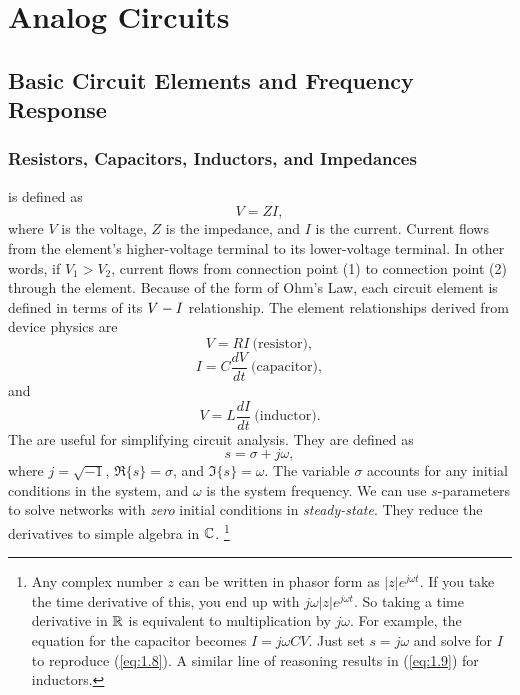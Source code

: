 \chapter{Analog Circuits} \hr
\section{Basic Circuit Elements and Frequency Response}
\subsection{Resistors, Capacitors, Inductors, and Impedances}
 is defined as
\begin{equation}
\label{eq:1.1}
V = Z I,
\end{equation}
where $V$ is the voltage, $Z$ is the impedance, and $I$ is the current. Current flows from the element's higher-voltage terminal to its lower-voltage terminal. In other words, if $V_{1} > V_{2}$, current flows from connection point (1) to connection point (2) through the element.
Because of the form of Ohm's Law, each circuit element is defined in terms of its $V \-- I$ relationship. The element relationships derived from device physics are
\begin{equation}
\label{eq:1.2}
V = R I ~\text{(resistor)},
\end{equation}
\begin{equation}
\label{eq:1.3}
I = C \frac{dV}{dt} ~\text{(capacitor)},
\end{equation}
and
\begin{equation}
\label{eq:1.4}
V = L \frac{dI}{dt} ~\text{(inductor)}.
\end{equation}
The  are useful for simplifying circuit analysis. They are defined as
\begin{equation}
\label{eq:1.5}
s = \sigma + j \omega,
\end{equation}
where $j = \sqrt{-1}$, $\Re\{ s \} = \sigma$, and $\Im\{ s \} = \omega$. The variable $\sigma$ accounts for any initial conditions in the system, and $\omega$ is the system frequency. We can use $s$-parameters to solve networks with \textit{zero} initial conditions in \textit{steady-state}. They reduce the derivatives to simple algebra in $\mathbb{C}$. \footnote{Any complex number $z$ can be written in phasor form as $|z| e^{j \omega t}$. If you take the time derivative of this, you end up with $j \omega |z| e^{j \omega t}$. So taking a time derivative in $\mathbb{R}$ is equivalent to multiplication by $j \omega$. For example, the equation for the capacitor becomes $I = j \omega C V$. Just set $s = j \omega$ and solve for $I$ to reproduce (\cref{eq:1.8}). A similar line of reasoning results in (\cref{eq:1.9}) for inductors.}

